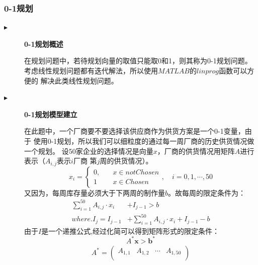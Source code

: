 \documentclass{cumcmthesis}
\begin{document}
\subsubsection*{0-1规划}
\begin{description}
    \item[$\blacktriangleright$] \textbf{0-1规划概述}\par
        在规划问题中，若待规划向量的取值只能取0和1，则其称为0-1规划问题。
        考虑线性规划问题都有迭代解法，所以使用$MATLAB$的$linprog$函数可以方便的
        解决此类线性规划问题。
    \item[$\blacktriangleright$] \textbf{0-1规划模型建立}\par
        在此题中，一个厂商要不要选择该供应商作为供货方案是一个0-1变量，由于
        使用0-1规划，所以我们可以细粒度的通过每一周厂商的历史供货情况做一个规划。
        设50家企业的选择情况是向量$x$，厂商的供货情况用矩阵$A$进行表示（$A_{i,j}$表示$i$厂商
        第$j$周的供货情况）。
        \begin{equation}
            x_i = \left\{
            \begin{aligned}
                0,\quad & x \in notChosen \\
                1 \quad & x \in Chosen
            \end{aligned}
            \right.,\quad i=0,1,\cdots,50 \nonumber
        \end{equation}
        又因为，每周库存量必须大于下两周的制作量$b$。故每周的限定条件为：
        \begin{equation}
            \begin{aligned}
                \sum_{i=1}^{50} A_{i,j} \cdot x_i & + I_{j-1}  > b                                             \\
                where. I_{j}  = I_{j-1}           & + \sum_{i=1}^{50} A_{i,j} \cdot x_i + I_{j-1} -b \nonumber
            \end{aligned}
        \end{equation}
        由于$I$是一个递推公式,经过化简可以得到矩阵形式的限定条件：
        \begin{equation}
            A^{*} \bm{x} > \bm{b^{*}} \nonumber
        \end{equation}
        {\small
        \begin{equation}
            \begin{aligned}
                A^* =
                \begin{pmatrix}
                    A_{1,1}                                & A_{1,2}                                & \cdots & A_{1,50}                                  \\

\end{pmatrix}
\end{aligned}
\end{equation}}
\end{description}
\end{document}

